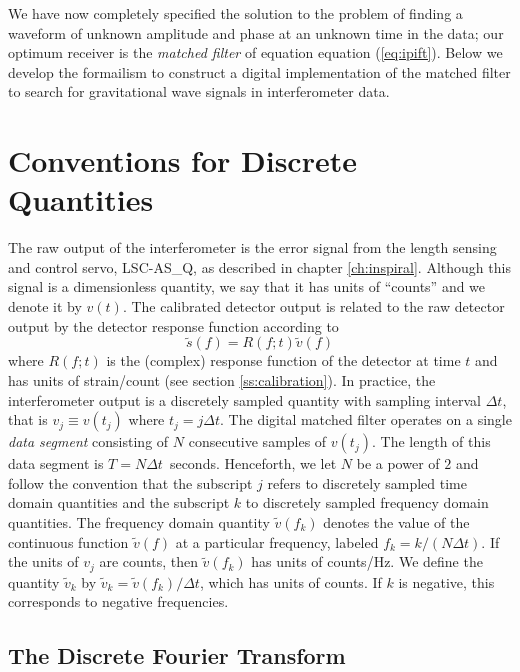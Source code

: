 We have now completely specified the solution to the problem of finding a
waveform of unknown amplitude and phase at an unknown time in the data;
our optimum receiver is the \emph{matched filter} of equation equation
(\ref{eq:ipift}). Below we develop the formailism to construct a digital
implementation of the matched filter to search for gravitational wave signals
in interferometer data.

\section{Conventions for Discrete Quantities}
\label{s:conventions}

The raw output of the interferometer is the error signal from the length
sensing and control servo, LSC-AS\_Q, as described in chapter
\ref{ch:inspiral}.  Although this signal is a dimensionless quantity, we say
that it has units of ``counts'' and we denote it by $v(t)$.  The calibrated
detector output is related to the raw detector output by the detector response
function according
to \begin{equation}
\tilde{s}(f) = R(f;t) \tilde{v}(f)
\end{equation}
where $R(f;t)$ is the (complex) response function of the detector at time $t$
and has units of strain/count (see section \ref{ss:calibration}).  In
practice, the interferometer output is a discretely sampled quantity with
sampling interval $\Delta t$, that is $v_j \equiv v(t_j)$ where $t_j = j\Delta
t$.  The digital matched filter operates on a single \emph{data segment}
consisting of $N$ consecutive samples of $v(t_j)$. The length of this data
segment is $T = N\Delta t$~seconds.  Henceforth, we let $N$ be a power of
$2$ and follow the convention that the subscript $j$ refers to discretely
sampled time domain quantities and the subscript $k$ to discretely sampled
frequency domain quantities.  The frequency domain quantity $\tilde{v}(f_k)$
denotes the value of the continuous function $\tilde{v}(f)$ at a particular
frequency, labeled $f_k = k/(N\Delta t)$. If the units of $v_j$ are counts,
then $\tilde{v}(f_k)$ has units of counts/Hz. We define the quantity
$\tilde{v}_k$ by $\tilde{v}_k = \tilde{v}(f_k) / \Delta t$, which has units of
counts. If $k$ is negative, this corresponds to negative frequencies.

\subsection{The Discrete Fourier Transform}
\label{ss:dft}

